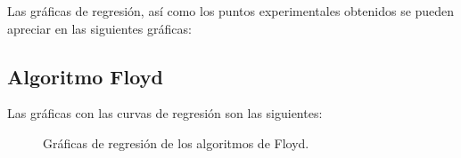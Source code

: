 \documentclass{homework}
\begin{document}
    Las gráficas de regresión, así como los puntos experimentales obtenidos se pueden apreciar en las siguientes gráficas:

    \subsection{Algoritmo Floyd}

    Las gráficas con las curvas de regresión son las siguientes:

    \begin{figure}[H]
        \centering


        \caption{Gráficas de regresión de los algoritmos de Floyd.}

        \label{hib:insercion}
    \end{figure}
\end{document}
